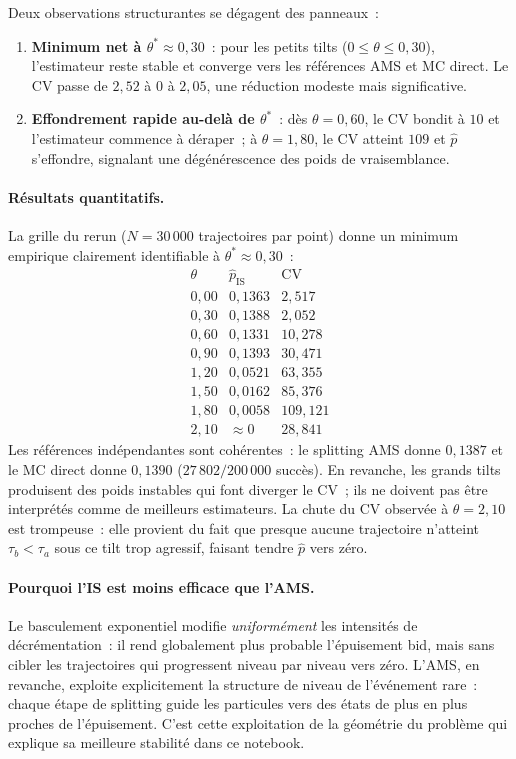 \documentclass[11pt,a4paper]{article}
\theoremstyle{definition}
\begin{document}
\begin{demonstration}
Deux observations structurantes se dégagent des panneaux~:
\begin{enumerate}
  \item \textbf{Minimum net à $\theta^*\approx0{,}30$}~: pour les petits tilts
    ($0\le\theta\le0{,}30$), l'estimateur reste stable et converge vers les
    références AMS et MC direct. Le CV passe de $2{,}52$ à $0$ à $2{,}05$,
    une réduction modeste mais significative.
  \item \textbf{Effondrement rapide au-delà de $\theta^*$}~: dès $\theta=0{,}60$,
    le CV bondit à $10$ et l'estimateur commence à déraper~; à $\theta=1{,}80$,
    le CV atteint $109$ et $\hat p$ s'effondre, signalant une dégénérescence
    des poids de vraisemblance.
\end{enumerate}

\paragraph{Résultats quantitatifs.}
La grille du rerun ($N=30\,000$ trajectoires par point) donne un minimum empirique
clairement identifiable à $\theta^*\approx0{,}30$~:
\[
\begin{array}{c|cc}
\theta & \hat p_\mathrm{IS} & \mathrm{CV}\\
\hline
0{,}00 & 0{,}1363 & 2{,}517\\
0{,}30 & 0{,}1388 & 2{,}052\\
0{,}60 & 0{,}1331 & 10{,}278\\
0{,}90 & 0{,}1393 & 30{,}471\\
1{,}20 & 0{,}0521 & 63{,}355\\
1{,}50 & 0{,}0162 & 85{,}376\\
1{,}80 & 0{,}0058 & 109{,}121\\
2{,}10 & \approx 0 & 28{,}841
\end{array}
\]
Les références indépendantes sont cohérentes~: le splitting AMS donne $0{,}1387$ et le MC
direct donne $0{,}1390$ ($27\,802/200\,000$ succès). En revanche, les grands tilts
produisent des poids instables qui font diverger le CV~; ils ne doivent pas être
interprétés comme de meilleurs estimateurs. La chute du CV observée à $\theta=2{,}10$
est trompeuse~: elle provient du fait que presque aucune trajectoire n'atteint
$\tau_b<\tau_a$ sous ce tilt trop agressif, faisant tendre $\hat p$ vers zéro.

\paragraph{Pourquoi l'IS est moins efficace que l'AMS.}
Le basculement exponentiel modifie \emph{uniformément} les intensités de
décrémentation~: il rend globalement plus probable l'épuisement bid, mais
sans cibler les trajectoires qui progressent niveau par niveau vers zéro.
L'AMS, en revanche, exploite explicitement la structure de niveau de l'événement
rare~: chaque étape de splitting guide les particules vers des états de plus en
plus proches de l'épuisement. C'est cette exploitation de la géométrie du problème
qui explique sa meilleure stabilité dans ce notebook.


\end{demonstration}
\end{document}
